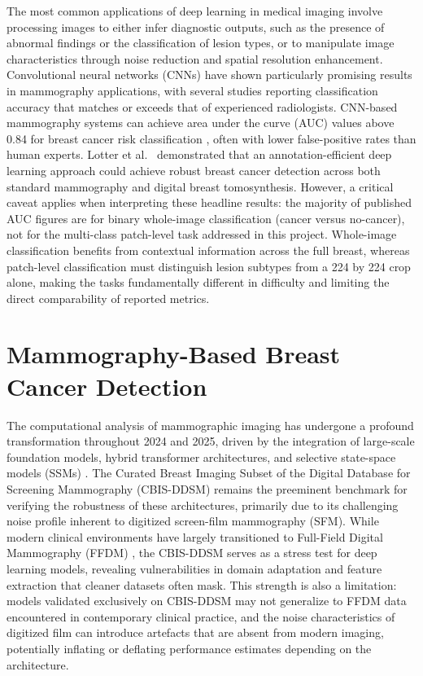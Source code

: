 \documentclass[justified,notoc,openany]{tufte-book}
\begin{document}
The most common applications of deep learning in medical imaging involve processing images to either infer diagnostic outputs, such as the presence of abnormal findings or the classification of lesion types, or to manipulate image characteristics through noise reduction and spatial resolution enhancement. Convolutional neural networks (CNNs) have shown particularly promising results in mammography applications, with several studies reporting classification accuracy that matches or exceeds that of experienced radiologists. CNN-based mammography systems can achieve area under the curve (AUC) values above 0.84 for breast cancer risk classification \cite{Wang2024,Lotter2021}, often with lower false-positive rates than human experts. Lotter et al.~\cite{Lotter2021} demonstrated that an annotation-efficient deep learning approach could achieve robust breast cancer detection across both standard mammography and digital breast tomosynthesis. However, a critical caveat applies when interpreting these headline results: the majority of published AUC figures are for binary whole-image classification (cancer versus no-cancer), not for the multi-class patch-level task addressed in this project. Whole-image classification benefits from contextual information across the full breast, whereas patch-level classification must distinguish lesion subtypes from a 224 by 224 crop alone, making the tasks fundamentally different in difficulty and limiting the direct comparability of reported metrics.

\section{Mammography-Based Breast Cancer Detection}\label{mammography-based-breast-cancer-detection}

The computational analysis of mammographic imaging has undergone a profound transformation throughout 2024 and 2025, driven by the integration of large-scale foundation models, hybrid transformer architectures, and selective state-space models (SSMs) \cite{Bayatmakou2025}. The Curated Breast Imaging Subset of the Digital Database for Screening Mammography (CBIS-DDSM) remains the preeminent benchmark for verifying the robustness of these architectures, primarily due to its challenging noise profile inherent to digitized screen-film mammography (SFM). While modern clinical environments have largely transitioned to Full-Field Digital Mammography (FFDM) \cite{SawyerLee2016}, the CBIS-DDSM serves as a stress test for deep learning models, revealing vulnerabilities in domain adaptation and feature extraction that cleaner datasets often mask. This strength is also a limitation: models validated exclusively on CBIS-DDSM may not generalize to FFDM data encountered in contemporary clinical practice, and the noise characteristics of digitized film can introduce artefacts that are absent from modern imaging, potentially inflating or deflating performance estimates depending on the architecture.
\end{document}
